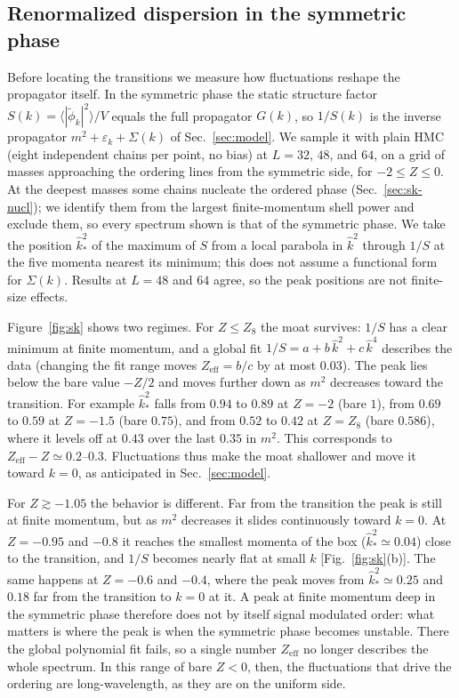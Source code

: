 \documentclass[aps,prd,twocolumn,superscriptaddress,nofootinbib,10pt]{revtex4-2}
\newcommand{\khat}{\widehat{k}^{2}}
\newcommand{\eff}{\mathrm{eff}}
\begin{document}
\subsection{Renormalized dispersion in the symmetric phase}
\label{sec:sk}

Before locating the transitions we measure how fluctuations reshape the
propagator itself.  In the symmetric phase the static structure factor
$S(k)=\langle|\tilde\phi_k|^2\rangle/V$ equals the full propagator $G(k)$,
so $1/S(k)$ is the inverse propagator $m^2+\varepsilon_k+\Sigma(k)$ of
Sec.~\ref{sec:model}.  We sample it with plain HMC (eight independent
chains per point, no bias) at $L=32$, $48$, and $64$, on a grid of masses
approaching the ordering lines from the symmetric side, for
$-2\le Z\le0$.  At the deepest masses some chains nucleate the ordered
phase (Sec.~\ref{sec:sk-nucl}); we identify them from the largest
finite-momentum shell power and exclude them, so every spectrum shown
is that of the symmetric phase.
We take the position $\khat_*$ of the maximum of $S$ from a local parabola in
$\khat$ through $1/S$ at the five momenta nearest its minimum; this does not
assume a functional form for $\Sigma(k)$.  Results at $L=48$ and $64$
agree, so the peak positions are not finite-size effects.

Figure~\ref{fig:sk} shows two regimes.  For $Z\le Z_8$ the moat survives:
$1/S$ has a clear minimum at finite momentum, and a global fit
$1/S=a+b\,\khat+c\,\widehat{k}^{4}$ describes the data (changing the fit
range moves $Z_\eff=b/c$ by at most $0.03$).  The peak lies below the bare
value $-Z/2$ and moves further down as $m^2$ decreases toward the transition.
For example $\khat_*$ falls from $0.94$ to $0.89$ at $Z=-2$ (bare $1$),
from $0.69$ to $0.59$ at $Z=-1.5$ (bare $0.75$), and
from $0.52$ to $0.42$ at $Z=Z_8$ (bare $0.586$), where it levels off at
$0.43$ over the last $0.35$ in $m^2$.  This corresponds to
$Z_\eff-Z\simeq0.2$--$0.3$.  Fluctuations thus make the moat shallower and
move it toward $k=0$, as anticipated in Sec.~\ref{sec:model}.

For $Z\gtrsim-1.05$ the behavior is different.  Far from the
transition the peak is still at finite momentum, but as $m^2$ decreases it
slides continuously toward $k=0$.  At $Z=-0.95$ and $-0.8$ it reaches the
smallest momenta of the box ($\khat_*\simeq0.04$) close to the transition,
and $1/S$ becomes nearly flat at small $k$ [Fig.~\ref{fig:sk}(b)].  The same
happens at $Z=-0.6$ and $-0.4$, where the peak moves from
$\khat_*\simeq0.25$ and $0.18$ far from the transition to $k=0$ at it.  A
peak at finite momentum deep in the symmetric phase therefore does not by
itself signal modulated order: what matters is where the peak is when the
symmetric phase becomes unstable.  There
the global polynomial fit fails, so a single number $Z_\eff$ no longer
describes the whole spectrum.  In this range of bare $Z<0$, then, the
fluctuations that drive the ordering are long-wavelength, as they are on the
uniform side.
\end{document}
